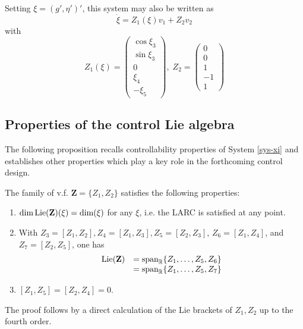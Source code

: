 \documentclass[a4paper,twoside]{article}
\def \RR {{\mathbb R}}
\def \finproof{\hfill\hbox{\vrule width1.0ex height1.5ex}}
\def \span {\textnormal{span}}
\newcommand{\tnm}[1]{\textnormal{#1}}
\begin{document}
Setting $\xi=(g',\eta')'$, this system may also be written as 
\begin{equation}
\label{sys-xi}
\dot \xi = Z_1(\xi) v_1 + Z_2 v_2
\end{equation}
with
\begin{equation} 
\label{Z1-Z2}
Z_1(\xi)= \begin{pmatrix} 
\cos \xi_3 \\ \sin \xi_3 \\ 0 \\ \xi_4 \\ -\xi_5
\end{pmatrix} , \; 
Z_2=\begin{pmatrix} 
0 \\ 0 \\ 1 \\ -1 \\ 1 
\end{pmatrix}
\end{equation}
\subsection{Properties of the control Lie algebra}

The following proposition recalls controllability properties of System \eqref{sys-xi} 
and establishes other properties which play a key role in the forthcoming control design.

\begin{proposition}
\label{prop1}
The family of v.f.  $\mathbf{Z}= \{Z_1,Z_2\}$ 
satisfies the following properties:
\begin{enumerate}
\item $\tnm{dim} \, \tnm{Lie}(\mathbf{Z})(\xi) = \tnm{dim}(\xi)$ for any $\xi$, i.e. the LARC is satisfied at any point.
\item With $Z_3= [Z_1,Z_2],  Z_4= [Z_1,Z_3], Z_5= [Z_2,Z_3]$, $Z_6= [Z_1,Z_4]$, and $Z_7= [Z_2,Z_5]$, one has
\[
\begin{array}{ll}
\tnm{Lie}(\mathbf{Z}) & =  
\span_{\RR} \{ Z_1, \ldots,Z_5, Z_6\} \\
  & = \span_{\RR} \{ Z_1, \ldots,Z_5, Z_7\}
\end{array}
\]
\item $[Z_1,Z_5]=[Z_2,Z_4]=0$.
\end{enumerate}
\end{proposition}
 The proof follows by a direct calculation of the Lie brackets of $Z_1, Z_2$ up to 
the fourth order. \finproof 
 
\end{document}
